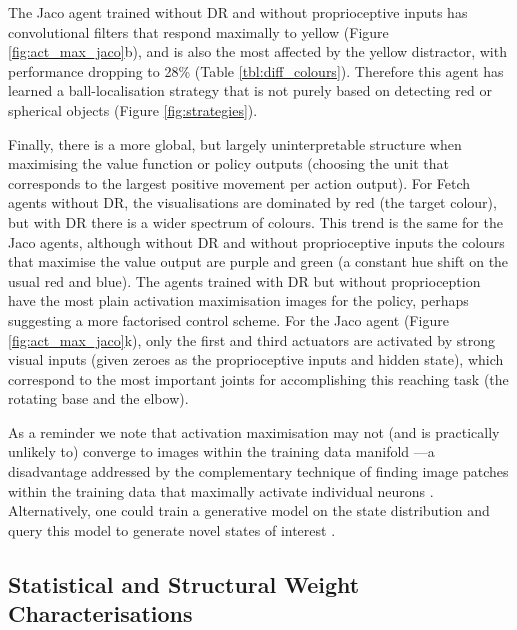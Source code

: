 The Jaco agent trained without DR and without proprioceptive inputs has
convolutional filters that respond maximally to yellow (Figure
\ref{fig:act_max_jaco}b), and is also the most affected by the yellow
distractor, with performance dropping to 28\% (Table
\ref{tbl:diff_colours}). Therefore this agent has learned a
ball-localisation strategy that is not purely based on detecting red or
spherical objects (Figure \ref{fig:strategies}).

Finally, there is a more global, but largely uninterpretable structure
when maximising the value function or policy outputs (choosing the unit
that corresponds to the largest positive movement per action output).
For Fetch agents without DR, the visualisations are dominated by red
(the target colour), but with DR there is a wider spectrum of colours.
This trend is the same for the Jaco agents, although without DR and
without proprioceptive inputs the colours that maximise the value output
are purple and green (a constant hue shift on the usual red and blue).
The agents trained with DR but without proprioception have the most
plain activation maximisation images for the policy, perhaps suggesting
a more factorised control scheme. For the Jaco agent (Figure
\ref{fig:act_max_jaco}k), only the first and third actuators are
activated by strong visual inputs (given zeroes as the proprioceptive
inputs and hidden state), which correspond to the most important joints
for accomplishing this reaching task (the rotating base and the elbow).

As a reminder we note that activation maximisation may not (and is
practically unlikely to) converge to images within the training data
manifold \cite{mahendran2015understanding}---a disadvantage addressed
by the complementary technique of finding image patches within the
training data that maximally activate individual neurons
\cite{girshick2014rich}. {Alternatively, one could train a generative model on the state distribution and query this model to generate novel states of interest}
\cite{olson2021counterfactual, rupprecht2020finding}.

\hypertarget{statistical-and-structural-weight-characterisations-1}{%
\subsection{Statistical and Structural Weight
Characterisations}\label{statistical-and-structural-weight-characterisations-1}}

\label{sec:statistical_and_structural}


